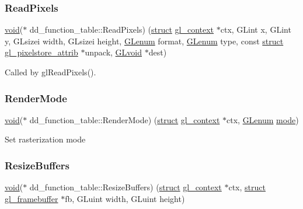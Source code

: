 \subsubsection{\texorpdfstring{Read\+Pixels}{ReadPixels}}
{\footnotesize\ttfamily \hyperlink{interfacevoid}{void}($\ast$ dd\+\_\+function\+\_\+table\+::\+Read\+Pixels) (\hyperlink{interfacestruct}{struct} \hyperlink{structgl__context}{gl\+\_\+context} $\ast$ctx, G\+Lint x, G\+Lint y, G\+Lsizei width, G\+Lsizei height, \hyperlink{interfacevoid}{G\+Lenum} format, \hyperlink{interfacevoid}{G\+Lenum} type, const \hyperlink{interfacestruct}{struct} \hyperlink{structgl__pixelstore__attrib}{gl\+\_\+pixelstore\+\_\+attrib} $\ast$unpack, \hyperlink{interfacevoid}{G\+Lvoid} $\ast$dest)}

Called by gl\+Read\+Pixels(). \mbox{\label{structdd__function__table_aeab038e3944ccf13ec3d4867bd3ff5eb}} 
\subsubsection{\texorpdfstring{Render\+Mode}{RenderMode}}
{\footnotesize\ttfamily \hyperlink{interfacevoid}{void}($\ast$ dd\+\_\+function\+\_\+table\+::\+Render\+Mode) (\hyperlink{interfacestruct}{struct} \hyperlink{structgl__context}{gl\+\_\+context} $\ast$ctx, \hyperlink{interfacevoid}{G\+Lenum} \hyperlink{interfacevoid}{mode})}

Set rasterization mode \mbox{\label{structdd__function__table_ab08456af9890bc6cd4aa7b202d63ab09}} 
\subsubsection{\texorpdfstring{Resize\+Buffers}{ResizeBuffers}}
{\footnotesize\ttfamily \hyperlink{interfacevoid}{void}($\ast$ dd\+\_\+function\+\_\+table\+::\+Resize\+Buffers) (\hyperlink{interfacestruct}{struct} \hyperlink{structgl__context}{gl\+\_\+context} $\ast$ctx, \hyperlink{interfacestruct}{struct} \hyperlink{structgl__framebuffer}{gl\+\_\+framebuffer} $\ast$fb, G\+Luint width, G\+Luint height)}

